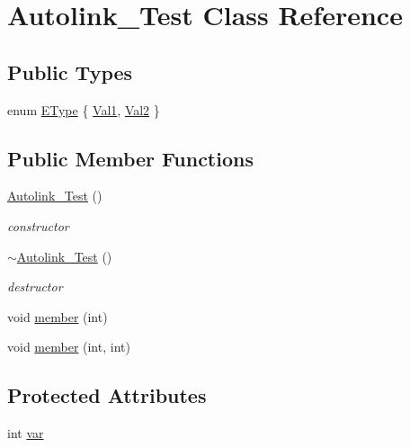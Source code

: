 \hypertarget{class_autolink___test}{}\section{Autolink\+\_\+\+Test Class Reference}
\label{class_autolink___test}
\subsection*{Public Types}
\begin{DoxyCompactItemize}
\item 
enum \hyperlink{class_autolink___test_ad5d0e87f61ba99c47a539492df7917a1}{E\+Type} \{ \hyperlink{class_autolink___test_ad5d0e87f61ba99c47a539492df7917a1a06bb6ba8ccdce459e14c7a917b07f6e4}{Val1}, 
\hyperlink{class_autolink___test_ad5d0e87f61ba99c47a539492df7917a1a470f89a037b58ee4ce04efe02907b410}{Val2}
 \}
\end{DoxyCompactItemize}
\subsection*{Public Member Functions}
\begin{DoxyCompactItemize}
\item 
\hyperlink{class_autolink___test_a4d8de7614847eca2cbaad61f4a8f0f15}{Autolink\+\_\+\+Test} ()
\begin{DoxyCompactList}\small\item\em constructor \end{DoxyCompactList}\item 
\hyperlink{class_autolink___test_a53069f9df63c2d47097eb12ea14796f5}{$\sim$\+Autolink\+\_\+\+Test} ()
\begin{DoxyCompactList}\small\item\em destructor \end{DoxyCompactList}\item 
void \hyperlink{class_autolink___test_a3b57d2ff9a1488b8e434478eb77e7846}{member} (int)
\item 
void \hyperlink{class_autolink___test_afbb46725b4cc672dbf7b52051ec6df8d}{member} (int, int)
\end{DoxyCompactItemize}
\subsection*{Protected Attributes}
\begin{DoxyCompactItemize}
\item 
int \hyperlink{class_autolink___test_a96c77f9f3a7baec84b9b8add26a31787}{var}
\end{DoxyCompactItemize}


